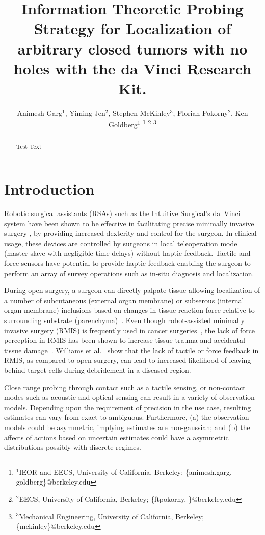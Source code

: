 \documentclass[letterpaper, 10 pt, conference]{ieeeconf}
\title{\LARGE \bf
Information Theoretic Probing Strategy for Localization of arbitrary closed tumors with no holes with the da Vinci Research Kit. 
}
\author{%
Animesh Garg$^{1}$,
Yiming Jen$^{2}$, 
Stephen McKinley$^{3}$,
Florian Pokorny$^{2}$,
Ken Goldberg$^{1}$%
\thanks{$^{1}$IEOR and EECS, University of California, Berkeley; {\{animesh.garg, goldberg\}@berkeley.edu}}%
\thanks{$^{2}$EECS, University of California, Berkeley; {\{ftpokorny, \todo{put email here}\}@berkeley.edu}}%
\thanks{$^{3}$Mechanical Engineering, University of California, Berkeley; {\{mckinley\}@berkeley.edu}}%
}
\begin{document}
\maketitle
\thispagestyle{empty}
\pagestyle{empty}

\begin{abstract}
Test Text
\end{abstract} 

\section{Introduction}
\label{sec:intro}

Robotic surgical assistants (RSAs) such as the Intuitive Surgical's da~Vinci system have been shown to be effective in facilitating precise minimally invasive surgery \cite{Darzi2004_ARM,veldkamp2005laparoscopic}, by providing increased dexterity and control for the surgeon. In clinical usage, these devices are controlled by surgeons in local teleoperation mode (master-slave with negligible time delays) without haptic feedback. Tactile and force sensors have potential to provide haptic feedback enabling the surgeon to perform an array of survey operations such as in-situ diagnosis and localization.

During open surgery, a surgeon can directly palpate tissue allowing localization of a number of subcutaneous (external organ membrane) or subserous (internal organ membrane) inclusions based on changes in tissue reaction force relative to surrounding substrate (parenchyma)~\cite{venkatesh2008magnetic}. Even though robot-assisted minimally invasive surgery (RMIS) is frequently used in cancer surgeries~\cite{ohuchida2013robotic}, the lack of force perception in RMIS has been shown to increase tissue trauma and accidental tissue damage~\cite{demi2005touch}.
Williams et al.~\cite{williams2010radical} show that the lack of tactile or force feedback in RMIS, as compared to open surgery, can lead to increased likelihood of leaving behind target cells during debridement in a diseased region.


Close range probing through contact such as a tactile sensing, or non-contact modes such as acoustic and optical sensing can result in a variety of observation models. Depending upon the requirement of precision in the use case, resulting estimates can vary from exact to ambiguous. Furthermore, (a) the observation models could be asymmetric, implying estimates are non-gaussian; and (b) the affects of actions based on uncertain estimates could have a asymmetric distributions possibly with discrete regimes.
\end{document}
